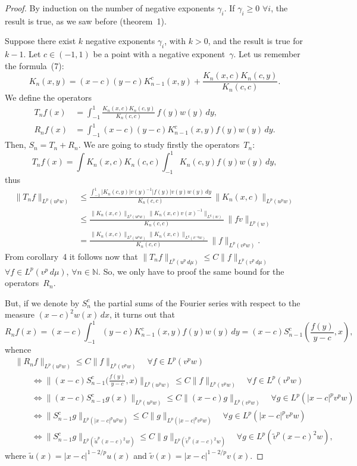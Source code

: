 \documentclass[a4paper,12pt]{article}
\theoremstyle{plain}
\theoremstyle{definition}
\newcommand{\N}{\mathbb{N}}
\begin{document}
\begin{proof}
By induction on the number of negative exponents $\gamma_{i}$.
If $\gamma_{i} \geq 0$ $\forall i$, the result is true, as we saw
before (theorem~1).

Suppose there exist $k$ negative exponents $\gamma_{i}$,
with $k > 0$, and the result is true for $k-1$. Let $c \in (-1,1)$
be a point with a negative exponent~$\gamma$.
Let us remember the formula~(7):
$$
K_{n}(x,y) = (x-c) (y-c) K_{n-1}^{c}(x,y)
+ \frac{K_{n}(x,c) K_{n}(c,y)}{K_{n}(c,c)}.
$$
We define the operators
\begin{align*}
T_{n}f(x) &= \int_{-1}^{1}
\frac{K_{n}(x,c) K_{n}(c,y)}{K_{n}(c,c)}\, f(y) w(y)\,dy,\\
R_{n}f(x) &= \int_{-1}^{1}
(x-c) (y-c) K_{n-1}^{c}(x,y) f(y) w(y)\,dy.
\end{align*}
Then, $S_{n} = T_{n} + R_{n}$. We are going to study
firstly the operators~$T_{n}$:
$$
T_{n}f(x) = \int{K_{n}(x,c)}{K_{n}(c,c)}
\int_{-1}^{1} K_{n}(c,y) f(y) w(y)\,dy,
$$
thus
\begin{align*}
\| T_{n}f \|_{L^{p}(u^{p}w)}
&\leq \frac{\int_{-1}^{1}  | K_{n}(c,y) | v(y)^{-1} | f(y) | v(y) w(y) \,dy}
{K_{n}(c,c)}\, \| K_{n}(x,c) \|_{L^{p}(u^{p}w)} \\
&\leq \frac{\| K_{n}(x,c) \|_{L^{p}(u^{p}w)}
\| K_{n}(x,c) v(x)^{-1} \|_{L^{q}(w)}}{K_{n}(c,c)}\,
\| f v \|_{L^{p}(w)} \\
&= \frac{\| K_{n}(x,c) \|_{L^{p}(u^{p}w)}
\| K_{n}(x,c) \|_{L^{q}(v^{-q}w)}}{K_{n}(c,c)}\,
\| f \|_{L^{p}(v^{p}w)}.
\end{align*}
From corollary~4 it follows now that $\| T_{n}f \|_{L^{p}(u^{p}\,d\mu)}
\leq C \| f \|_{L^{p}(v^{p}\,d\mu)}$
$\forall f \in L^{p}(v^{p}\,d\mu)$,
$\forall n \in \N$. So, we only have
to proof the same bound for the operators~$R_{n}$.

But, if we denote by $S_{n}^{c}$ the partial sums of the Fourier
series with respect to the measure $(x-c)^{2}w(x)\,dx$,
it turns out that
$$
R_{n}f(x) = (x-c) \int_{-1}^{1} (y-c) K_{n-1}^{c}(x,y) f(y) w(y)\,dy
= (x-c) S_{n-1}^{c} \left(\frac{f(y)}{y-c}, x \right),
$$
whence
\begin{align*}
&\| R_{n}f \|_{L^{p}(u^{p}w)} \leq C \| f \|_{L^{p}(v^{p}w)}
\quad\forall f \in L^{p}(v^{p}w) \\
&\qquad\iff
\big\| (x-c) S_{n-1}^{c} \big(\tfrac{f(y)}{y-c}, x \big) \big\|_{L^{p}(u^{p}w)}
\leq C \| f \|_{L^{p}(v^{p}w)}
\quad\forall f \in L^{p}(v^{p}w) \\
&\qquad\iff
\| (x-c) S_{n-1}^{c}g (x) \|_{L^{p}(u^{p}w)}
\leq C \| (x-c) g \|_{L^{p}(v^{p}w)}
\quad\forall g \in L^{p}(|x-c|^{p} v^{p}w) \\
&\qquad\iff
\| S_{n-1}^{c}g \|_{L^{p}(|x-c|^{p}u^{p}w)}
\leq C \| g \|_{L^{p}(|x-c|^{p}v^{p}w)}
\quad\forall g \in L^{p}(|x-c|^{p} v^{p}w) \\
&\qquad\iff
\| S_{n-1}^{c}g \|_{L^{p}({\tilde{u}}^{p}(x-c)^{2}w)}
\leq C \| g \|_{L^{p}({\tilde{v}}^{p}(x-c)^{2}w)}
\quad\forall g \in L^{p}({\tilde{v}}^{p}(x-c)^{2}w),
\end{align*}
where $\tilde{u}(x) = | x - c |^{1-2/p} u(x)$
and $\tilde{v}(x) = | x - c |^{1-2/p} v(x)$.


\end{proof}
\end{document}
